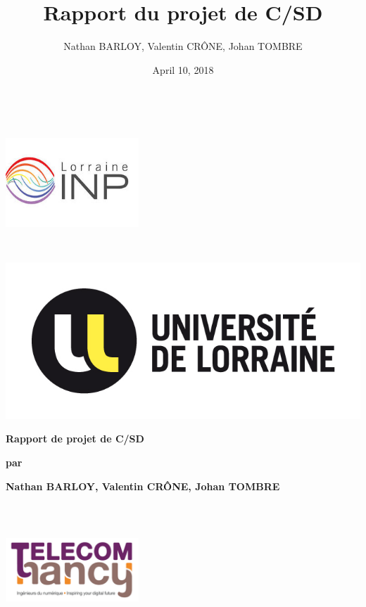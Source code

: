 \documentclass[11pt,a4paper]{report}
\title{Rapport du projet de C/SD}
\author{Nathan BARLOY, Valentin CRÔNE, Johan TOMBRE}
\date{April 10, 2018}
\begin{document}
\begin{titlepage}
\centering
        \begin{flushleft}\hspace{1cm}
\begin{flushleft}\includegraphics[keepaspectratio, width=5cm,height=5cm]{img/Logoinp.jpg}\end{flushleft}
        \end{flushleft}
        \vspace*{-4cm}
        \begin{flushright}
        \includegraphics{img/Logouniv.jpg}
        \end{flushright}
        \vspace*{1cm}
        \vspace*{1cm}
        {\LARGE \bfseries Rapport de projet de C/SD \par}
        \vspace*{0.5cm}
        {\LARGE \bfseries par\par}
        \vspace*{0.5cm}
        {\LARGE \bfseries Nathan BARLOY, Valentin CRÔNE, Johan TOMBRE\par}
        \vfill
        \begin{flushright}
\begin{flushright}\includegraphics[keepaspectratio, width=5cm,height=5cm]{img/LogoTelecom.png}\end{flushright}

\end{flushright}
\end{titlepage}
\end{document}
